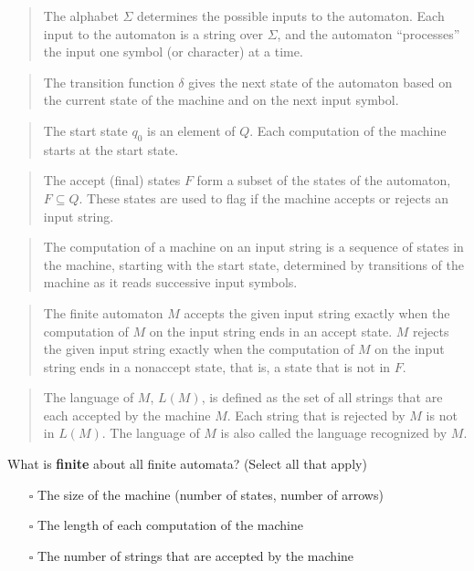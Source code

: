 \documentclass[12pt, oneside]{article}
\begin{document}
\begin{quote}  
The alphabet $\Sigma$ determines the possible inputs to the automaton. 
Each input to the automaton is a string over  $\Sigma$, and the automaton ``processes'' the input
one symbol (or character) at a time.
\end{quote}

\begin{quote}
The transition function $\delta$ gives the next state of the automaton based on the current state of 
the machine and on the next input symbol.
\end{quote}

\begin{quote}
The start state $q_0$ is an element of $Q$.  Each computation of the machine starts at the  start  state.
\end{quote}

\begin{quote}
The accept (final) states $F$ form a subset of the states of the automaton, $F \subseteq  Q$. 
These states are used to flag if the machine accepts or rejects an input string.
\end{quote}


\begin{quote}
The computation of a machine on an input string is a sequence of states
in the machine,  starting with the start state, determined by transitions 
of the machine as it reads successive input symbols.
\end{quote}

\begin{quote}
The finite automaton $M$ accepts the given input string exactly when the computation of $M$ on the input string
ends in an accept state. $M$ rejects the given input string exactly when the computation of 
$M$ on the input string ends in a nonaccept state, that is, a state that is not in $F$.
\end{quote}

\begin{quote} 
The language of $M$, $L(M)$, is defined as the set of  all strings that are each accepted 
by the machine $M$. Each string that is rejected by $M$ is not in $L(M)$.
The language of $M$ is also called the language recognized by $M$.
\end{quote}   
   
What is {\bf finite} about all finite automata? (Select all that apply)
\begin{itemize}
   \item[$\square$] The size of the machine (number of states, number of arrows)
   \item[$\square$] The length of each computation of the machine
   \item[$\square$] The number of strings that are accepted by the machine
\end{itemize}
\newpage
  
\end{document}
